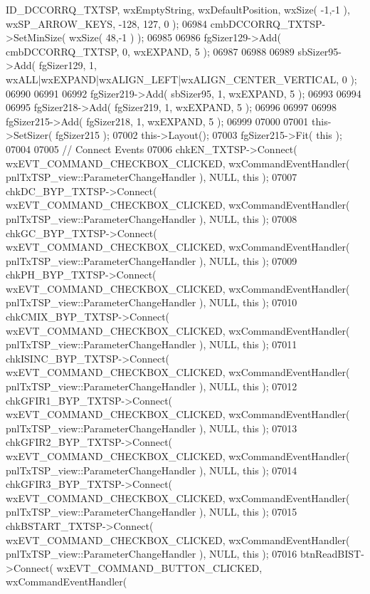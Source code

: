\begin{DoxyCode}
      ID_DCCORRQ_TXTSP, wxEmptyString, wxDefaultPosition, wxSize( -1,-1 ), wxSP\_ARROW\_KEYS, -128, 127, 0 );
06984     cmbDCCORRQ_TXTSP->SetMinSize( wxSize( 48,-1 ) );
06985     
06986     fgSizer129->Add( cmbDCCORRQ_TXTSP, 0, wxEXPAND, 5 );
06987     
06988     
06989     sbSizer95->Add( fgSizer129, 1, wxALL|wxEXPAND|wxALIGN\_LEFT|wxALIGN\_CENTER\_VERTICAL, 0 );
06990     
06991     
06992     fgSizer219->Add( sbSizer95, 1, wxEXPAND, 5 );
06993     
06994     
06995     fgSizer218->Add( fgSizer219, 1, wxEXPAND, 5 );
06996     
06997     
06998     fgSizer215->Add( fgSizer218, 1, wxEXPAND, 5 );
06999     
07000     
07001     this->SetSizer( fgSizer215 );
07002     this->Layout();
07003     fgSizer215->Fit( \textcolor{keyword}{this} );
07004     
07005     \textcolor{comment}{// Connect Events}
07006     chkEN_TXTSP->Connect( wxEVT\_COMMAND\_CHECKBOX\_CLICKED, wxCommandEventHandler( 
      pnlTxTSP_view::ParameterChangeHandler ), NULL, \textcolor{keyword}{this} );
07007     chkDC_BYP_TXTSP->Connect( wxEVT\_COMMAND\_CHECKBOX\_CLICKED, wxCommandEventHandler( 
      pnlTxTSP_view::ParameterChangeHandler ), NULL, \textcolor{keyword}{this} );
07008     chkGC_BYP_TXTSP->Connect( wxEVT\_COMMAND\_CHECKBOX\_CLICKED, wxCommandEventHandler( 
      pnlTxTSP_view::ParameterChangeHandler ), NULL, \textcolor{keyword}{this} );
07009     chkPH_BYP_TXTSP->Connect( wxEVT\_COMMAND\_CHECKBOX\_CLICKED, wxCommandEventHandler( 
      pnlTxTSP_view::ParameterChangeHandler ), NULL, \textcolor{keyword}{this} );
07010     chkCMIX_BYP_TXTSP->Connect( wxEVT\_COMMAND\_CHECKBOX\_CLICKED, wxCommandEventHandler( 
      pnlTxTSP_view::ParameterChangeHandler ), NULL, \textcolor{keyword}{this} );
07011     chkISINC_BYP_TXTSP->Connect( wxEVT\_COMMAND\_CHECKBOX\_CLICKED, wxCommandEventHandler( 
      pnlTxTSP_view::ParameterChangeHandler ), NULL, \textcolor{keyword}{this} );
07012     chkGFIR1_BYP_TXTSP->Connect( wxEVT\_COMMAND\_CHECKBOX\_CLICKED, wxCommandEventHandler( 
      pnlTxTSP_view::ParameterChangeHandler ), NULL, \textcolor{keyword}{this} );
07013     chkGFIR2_BYP_TXTSP->Connect( wxEVT\_COMMAND\_CHECKBOX\_CLICKED, wxCommandEventHandler( 
      pnlTxTSP_view::ParameterChangeHandler ), NULL, \textcolor{keyword}{this} );
07014     chkGFIR3_BYP_TXTSP->Connect( wxEVT\_COMMAND\_CHECKBOX\_CLICKED, wxCommandEventHandler( 
      pnlTxTSP_view::ParameterChangeHandler ), NULL, \textcolor{keyword}{this} );
07015     chkBSTART_TXTSP->Connect( wxEVT\_COMMAND\_CHECKBOX\_CLICKED, wxCommandEventHandler( 
      pnlTxTSP_view::ParameterChangeHandler ), NULL, \textcolor{keyword}{this} );
07016     btnReadBIST->Connect( wxEVT\_COMMAND\_BUTTON\_CLICKED, wxCommandEventHandler( 

\end{DoxyCode}
